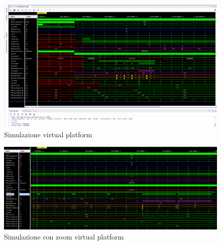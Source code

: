 \documentclass[]{IEEEtran}
\begin{document}
\begin{figure}[bt]
    \centering
    \includegraphics[width=\textwidth]{figures/SIM_VP.png}
    \caption{Simulazione virtual platform}
    \label{fig:SIM_VP}
\end{figure}

\begin{figure}[bt]
    \centering
    \includegraphics[width=\textwidth]{figures/SIM_VP_ZOOM.png}
    \caption{Simulazione con zoom virtual platform}
    \label{fig:SIM_VP_ZOOM}
\end{figure}
\end{document}
